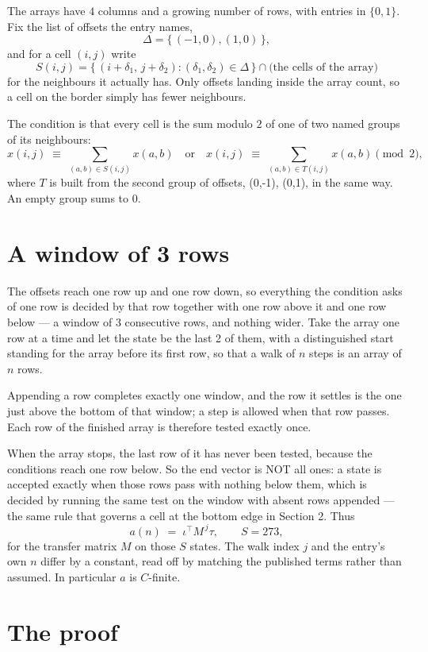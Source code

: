 \documentclass[11pt,a4paper]{article}
\theoremstyle{plain}
\theoremstyle{definition}
\begin{document}
The arrays have $4$ columns and a growing number of rows, with entries in $\{0,1\}$. Fix the
list of offsets the entry names,
\[
\Delta=\{\,(-1,0), (1,0)\,\},
\]
and for a cell $(i,j)$ write
\[
S(i,j)=\{\,(i+\delta_1,\,j+\delta_2) : (\delta_1,\delta_2)\in\Delta\,\}\cap
\text{(the cells of the array)}
\]
for the neighbours it actually has. Only offsets landing inside the array count, so a cell on
the border simply has fewer neighbours.

The condition is that every cell is the sum modulo $2$ of one of two named groups of its neighbours:
\[
x(i,j)\;\equiv\;\sum_{(a,b)\in S(i,j)}x(a,b) \quad\text{or}\quad x(i,j)\;\equiv\;\sum_{(a,b)\in T(i,j)}x(a,b) \pmod{2},
\]
where $T$ is built from the second group of offsets, (0,-1), (0,1), in the same way. An empty group sums to $0$.

\section{A window of 3 rows}

The offsets reach one row up and one row down, so everything the condition asks of one row is
decided by that row together with one row above it and one row below --- a window of
$3$ consecutive rows, and nothing wider. Take the array one row at a time
and let the state be the last 2 of them, with a distinguished start standing for the
array before its first row, so that a walk of $n$ steps is an array of $n$ rows.

Appending a row completes exactly one window, and the row it settles is the one just above the bottom of that window; a step is
allowed when that row passes. Each row of the finished
array is therefore tested exactly once.

When the array stops, the last row of it has never been tested, because the
conditions reach one row below. So the end vector is NOT all ones: a state is accepted exactly when
those rows pass with nothing below them, which is decided by running the same test on the window
with absent rows appended --- the same rule that governs a cell at the bottom edge in
Section 2.
Thus
\[
a(n)\;=\;\iota^{\!\top}M^{\,j}\tau ,\qquad S=273,
\]
for the transfer matrix $M$ on those $S$ states. The walk index $j$ and the entry's own $n$
differ by a constant, read off by matching the published terms rather than assumed. In
particular $a$ is $C$-finite.

\section{The proof}
\end{document}

